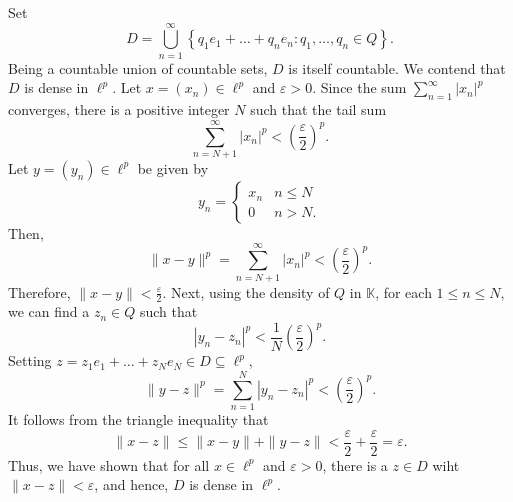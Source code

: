 \documentclass[10pt]{amsart}
\theoremstyle{thmstyle}
\theoremstyle{defstyle}
\newcommand{\K}{\mathbb{K}}
\renewcommand{\le}{\leqslant}
\begin{document}
Set 
\begin{equation*}
	D = \bigcup_{n = 1}^\infty\left\{q_1e_1 + \dots + q_ne_n\colon q_1,\dots,q_n\in Q\right\}.
\end{equation*}
Being a countable union of countable sets, $D$ is itself countable. We contend that $D$ is dense in $\ell^p$. Let $x = (x_n)\in\ell^p$ and $\varepsilon > 0$. Since the sum $\displaystyle\sum_{n = 1}^\infty |x_n|^p$ converges, there is a positive integer $N$ such that the tail sum 
\begin{equation*}
	\sum_{n = N + 1}^\infty |x_n|^p < \left(\frac{\varepsilon}{2}\right)^p.
\end{equation*}
Let $y = (y_n)\in\ell^p$ be given by 
\begin{equation*}
	y_n = \begin{cases}
		x_n & n\le N\\
		0 & n > N.
	\end{cases}
\end{equation*}
Then, 
\begin{equation*}
	\|x - y\|^p = \sum_{n = N + 1}^\infty |x_n|^p < \left(\frac{\varepsilon}{2}\right)^p.
\end{equation*}
Therefore, $\|x - y\| < \frac{\varepsilon}{2}$. Next, using the density of $Q$ in $\K$, for each $1\le n\le N$, we can find a $z_n\in Q$ such that 
\begin{equation*}
	|y_n - z_n|^p < \frac{1}{N}\left(\frac{\varepsilon}{2}\right)^p.
\end{equation*}
Setting $z = z_1e_1 + \dots + z_Ne_N\in D\subseteq\ell^p$,
\begin{equation*}
	\|y - z\|^p = \sum_{n = 1}^N |y_n - z_n|^p < \left(\frac{\varepsilon}{2}\right)^p.
\end{equation*}
It follows from the triangle inequality that 
\begin{equation*}
	\|x - z\|\le \|x - y\| + \|y - z\| < \frac{\varepsilon}{2} + \frac{\varepsilon}{2} = \varepsilon.
\end{equation*}
Thus, we have shown that for all $x\in\ell^p$ and $\varepsilon > 0$, there is a $z\in D$ wiht $\|x - z\| < \varepsilon$, and hence, $D$ is dense in $\ell^p$.
\end{document}
